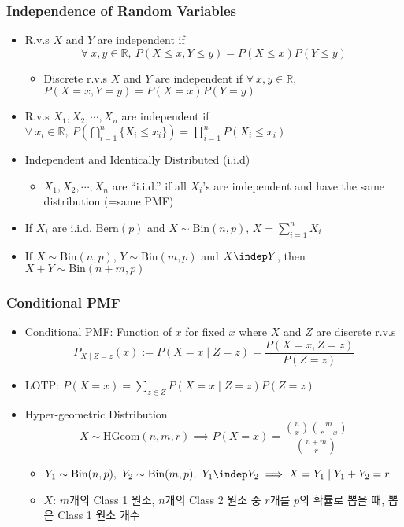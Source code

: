 \subsubsection*{Independence of Random Variables}
\begin{itemize}
    \item R.v.s $X$ and $Y$ are independent if
    \begin{equation}
        \forall~x,y\in\mathbb{R},~P(X\leq x,Y\leq y)=P(X\leq x)P(Y\leq y)
    \end{equation}
    \begin{itemize}
        \item Discrete r.v.s $X$ and $Y$ are independent if $\forall~x,y\in\mathbb{R}$, $P(X=x,Y=y)=P(X=x)P(Y=y)$
    \end{itemize}
    \item R.v.s $X_1,X_2,\cdots,X_n$ are independent if $\forall~x_i\in\mathbb{R},~P\left(\bigcap_{i=1}^n\{X_i\leq x_i\}\right)=\prod_{i=1}^nP(X_i\leq x_i)$
    \item Independent and Identically Distributed (i.i.d)
    \begin{itemize}
        \item $X_1,X_2,\cdots,X_n$ are ``i.i.d.'' if all $X_i$'s are independent and have the same distribution (=same PMF)
    \end{itemize}
    \item If $X_i$ are i.i.d. $\text{Bern}(p)$ and $X\sim\text{Bin}(n,p)$, $X=\sum_{i=1}^nX_i$
    \item If $X\sim\text{Bin}(n,p)$, $Y\sim\text{Bin}(m,p)$ and $X\indep Y$, then $X+Y\sim\text{Bin}(n+m,p)$
\end{itemize}

\subsubsection*{Conditional PMF}
\begin{itemize}
    \item Conditional PMF: Function of $x$ for fixed $x$ where $X$ and $Z$ are discrete r.v.s
    \begin{equation}
        P_{X\mid Z=z}(x):=P(X=x\mid Z=z)=\frac{P(X=x,Z=z)}{P(Z=z)}
    \end{equation}
    \item LOTP: $P(X=x)=\sum_{z\in Z}P(X=x\mid Z=z)P(Z=z)$
    \item Hyper-geometric Distribution
    \begin{equation}
        X\sim\text{HGeom}(n,m,r)\implies P(X=x)=\frac{\binom{n}{x}\binom{m}{r-x}}{\binom{n+m}{r}}
    \end{equation}
    \begin{itemize}
        \item $Y_1\sim\text{Bin}(n,p),~Y_2\sim\text{Bin}(m,p),~Y_1\indep Y_2\implies X=Y_1\mid Y_1+Y_2=r$
        \item $X$: $m$개의 Class 1 원소, $n$개의 Class 2 원소 중 $r$개를 $p$의 확률로 뽑을 때, 뽑은 Class 1 원소 개수
    \end{itemize}
\end{itemize}
